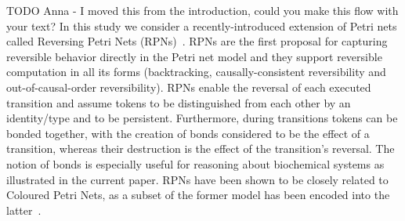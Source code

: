 \documentclass[runningheads]{llncs}
\begin{document}
TODO Anna - I moved this from the introduction, could you make this flow with your text? In this study we consider
a recently-introduced extension of Petri nets called Reversing Petri Nets (RPNs)~\cite{RPNs}.
RPNs are the first proposal for capturing reversible behavior directly in the Petri net model
and they support reversible computation in all its forms
(backtracking, causally-consistent reversibility and out-of-causal-order reversibility).
RPNs  enable the reversal of each executed transition and assume tokens to be distinguished from each 
other by an identity/type and to be persistent. Furthermore,
during transitions tokens can be bonded together, with  the creation of bonds
 considered to be the effect of a transition, whereas their destruction is the effect of
the transition's reversal. The notion of bonds is especially useful for reasoning about biochemical
systems as illustrated in the current paper. %
RPNs have been shown to be closely related to Coloured Petri Nets, as a subset of the former model
has been encoded into the latter~\cite{RPNtoCPN}.
\end{document}
